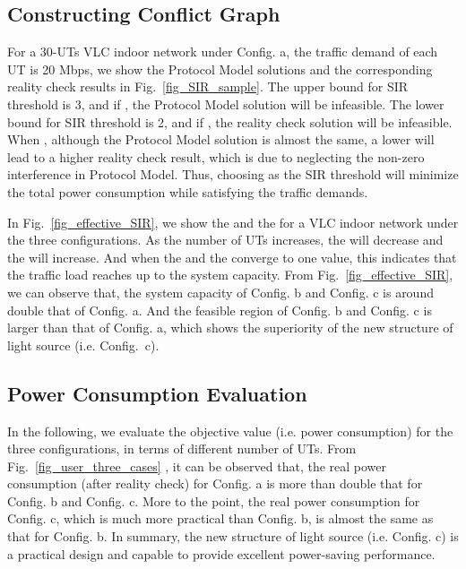 \documentclass[10pt,journal]{IEEEtran}
\begin{document}
\subsection{Constructing Conflict Graph}
For a 30-UTs VLC indoor network under Config. a, the traffic demand of each UT is 20 Mbps, we show the Protocol Model solutions and the corresponding reality check results in Fig.~\ref{fig_SIR_sample}. The upper bound for SIR threshold  is 3, and if , the Protocol Model solution will be infeasible. The lower bound for SIR threshold  is 2, and if , the reality check solution will be infeasible. When , although the Protocol Model solution is almost the same, a lower  will lead to a higher reality check result, which is due to neglecting the non-zero interference in Protocol Model. Thus, choosing  as the SIR threshold will minimize the total power consumption while satisfying the traffic demands.

In Fig.~\ref{fig_effective_SIR}, we show the  and the  for a VLC indoor network under the three configurations. As the number of UTs increases, the  will decrease and the  will increase. And when the  and the  converge to one value, this indicates that the traffic load reaches up to the system capacity. From Fig.~\ref{fig_effective_SIR}, we can observe that, the system capacity of Config. b and Config. c is around double that of Config. a. And the feasible region of Config. b and Config. c is larger than that of Config. a, which shows the superiority of the new structure of light source (i.e. Config.~c).




\subsection{Power Consumption Evaluation}
In the following, we evaluate the objective value (i.e. power consumption) for the three configurations, in terms of different number of UTs. From Fig.~\ref{fig_user_three_cases} , it can be observed that, the real power consumption (after reality check) for Config. a is more than double that for Config. b and Config. c. More to the point, the real power consumption for Config. c, which is much more practical than Config. b, is almost the same as that for Config. b. In summary, the new structure of light source (i.e. Config. c) is a practical design and capable to provide excellent power-saving performance.
\end{document}
